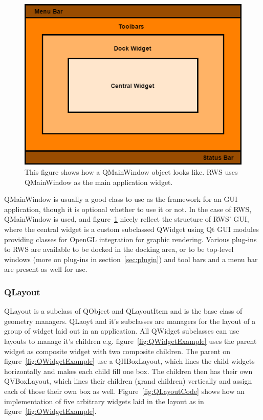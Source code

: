 \begin{figure}[h]
	\centering
	\includegraphics[scale=0.55]{Figures/QMainWindowExample.png}
	\caption{This figure shows how a QMainWindow object looks like. RWS uses QMainWindow as the main application widget.}
	\label{fig:QMainWindowExample}
\end{figure}

QMainWindow is usually a good class to use as the framework for an GUI application, though it is optional whether to use it or not. In the case of RWS, QMainWindow is used, and figure~\ref{fig:QMainWindowExample} nicely reflect the structure of RWS' GUI, where the central widget is a custom subclassed QWidget using Qt GUI modules providing classes for OpenGL integration for graphic rendering. Various plug-ins to RWS are available to be docked in the docking area, or to be top-level windows (more on plug-ins in section~\ref{sec:plugin}) and tool bars and a menu bar are present as well for use.

\subsubsection{QLayout}
\label{sec:QLayout}
QLayout is a subclass of QObject and QLayoutItem and is the base class of geometry managers. QLaoyt and it's subclasses are managers for the layout of a group of widget laid out in an application. All QWidget subclasses can use layouts to manage it's children e.g. figure~\ref{fig:QWidgetExample} uses the parent widget as composite widget with two composite children. The parent on figure~\ref{fig:QWidgetExample} use a QHBoxLayout, which lines the child widgets horizontally and makes each child fill one box. The children then has their own QVBoxLayout, which lines their children (grand children) vertically and assign each of those their own box as well. Figure~\ref{fig:QLayoutCode} shows how an implementation of five arbitrary widgets laid in the layout as in figure~\ref{fig:QWidgetExample}.

